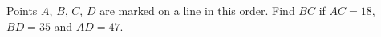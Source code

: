 Points $A$, $B$, $C$, $D$ are marked on a line in this order. Find $BC$ if $AC=18$, $BD=35$ and $AD=47$.
